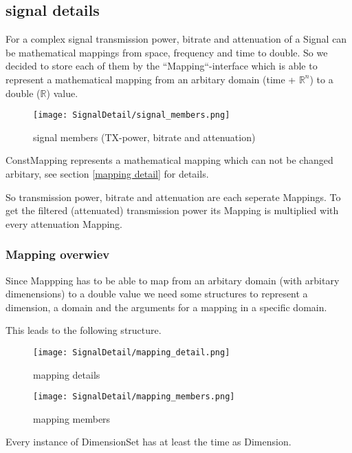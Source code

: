

\subsection{signal details}
\label{sec:signaldetail}

For a complex signal transmission power, bitrate and attenuation of a Signal
can be mathematical mappings from space, frequency and time to double. So
we decided to store each of them by the ``Mapping``-interface which is able to
represent a mathematical mapping from an arbitary domain (time + $\mathbb{R}^n$)
to a double ($\mathbb{R}$) value.

\begin{figure}[H]
 \centering
 \texttt{[image: SignalDetail/signal\_members.png]}
 \caption{signal members (TX-power, bitrate and attenuation)}
 \label{fig:signal members detail}
\end{figure}

ConstMapping represents a mathematical mapping which can not be changed
arbitary, see section \ref{mapping detail} for details.

So transmission power, bitrate and attenuation are each seperate Mappings. To
get the filtered (attenuated) transmission power its Mapping is multiplied with
every attenuation Mapping.
\newpage

\subsubsection{Mapping overwiev}

Since Mappping has to be able to map from an arbitary domain (with arbitary
dimenensions) to a double value we need some structures to represent a
dimension, a domain and the arguments for a mapping in a specific domain.

This leads to the following structure.

\begin{figure}[H]
 \centering
 \texttt{[image: SignalDetail/mapping\_detail.png]}
 \caption{mapping details}
 \label{fig:mapping detail}
\end{figure}

\begin{figure}[H]
 \centering
 \texttt{[image: SignalDetail/mapping\_members.png]}
 \caption{mapping members}
 \label{fig:mapping members}
\end{figure}

Every instance of DimensionSet has at least the time as Dimension.
\newline

